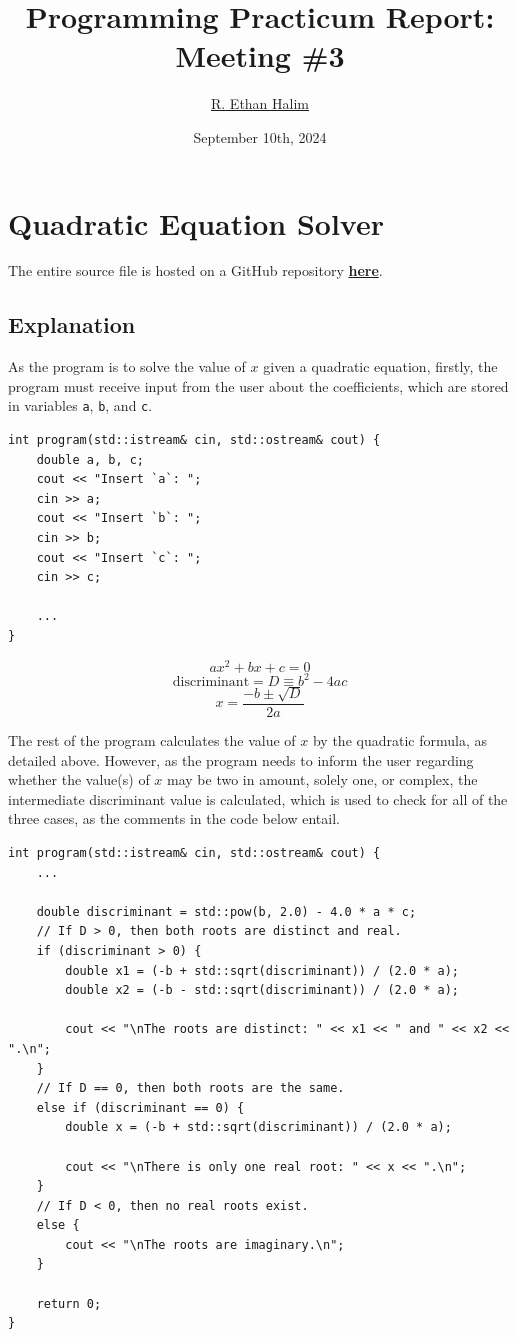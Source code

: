 \documentclass[12pt]{article}
\title{Programming Practicum Report:\\Meeting \#3}
\author{\href{https://github.com/avaxar}{R. Ethan Halim}}
\date{September 10th, 2024}
\begin{document}
\maketitle

\section{Quadratic Equation Solver}
The entire source file is hosted on a GitHub repository \href{https://github.com/avaxar/uni-practica-1/tree/main/week_3/01_quadratic}{\textbf{here}}.

\subsection{Explanation}

As the program is to solve the value of $x$ given a quadratic equation, firstly, the program must receive input from the user about the coefficients, which are stored in variables \texttt{a}, \texttt{b}, and \texttt{c}.

\begin{verbatim}
int program(std::istream& cin, std::ostream& cout) {
    double a, b, c;
    cout << "Insert `a`: ";
    cin >> a;
    cout << "Insert `b`: ";
    cin >> b;
    cout << "Insert `c`: ";
    cin >> c;

    ...
}
\end{verbatim}

\pagebreak
$$ax^2 + bx + c = 0$$
$$\text{discriminant} = D \equiv b^2 - 4ac$$
$$x = \frac{-b \pm \sqrt{D}}{2a}$$

The rest of the program calculates the value of $x$ by the quadratic formula, as detailed above. However, as the program needs to inform the user regarding whether the value(s) of $x$ may be two in amount, solely one, or complex, the intermediate discriminant value is calculated, which is used to check for all of the three cases, as the comments in the code below entail.

\begin{verbatim}
int program(std::istream& cin, std::ostream& cout) {
    ...

    double discriminant = std::pow(b, 2.0) - 4.0 * a * c;
    // If D > 0, then both roots are distinct and real.
    if (discriminant > 0) {
        double x1 = (-b + std::sqrt(discriminant)) / (2.0 * a);
        double x2 = (-b - std::sqrt(discriminant)) / (2.0 * a);

        cout << "\nThe roots are distinct: " << x1 << " and " << x2 << ".\n";
    }
    // If D == 0, then both roots are the same.
    else if (discriminant == 0) {
        double x = (-b + std::sqrt(discriminant)) / (2.0 * a);

        cout << "\nThere is only one real root: " << x << ".\n";
    }
    // If D < 0, then no real roots exist.
    else {
        cout << "\nThe roots are imaginary.\n";
    }

    return 0;
}
\end{verbatim}
\end{document}
